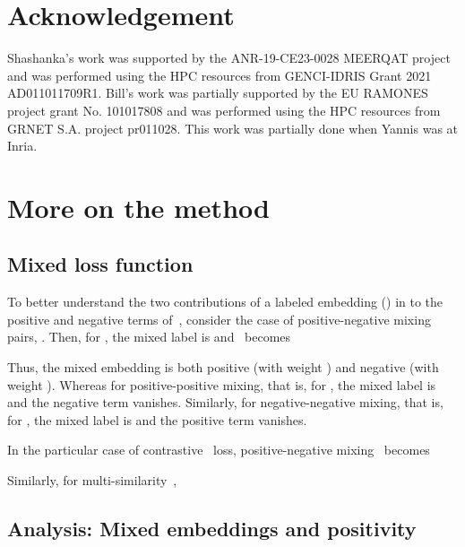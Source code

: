 \documentclass{article}
\makeatletter
\renewcommand\paragraph{\@startsection{paragraph}{4}{\z@}{1ex}{-1em}{\normalfont\normalsize\bfseries}}
\makeatother
\begin{document}
\section{Acknowledgement}
\label{sec:acknowledgement}
Shashanka's work was supported by the ANR-19-CE23-0028 MEERQAT project and was performed using the HPC resources from GENCI-IDRIS Grant 2021 AD011011709R1. Bill's work was partially supported by the EU RAMONES project grant No. 101017808 and was performed using the HPC resources from GRNET S.A. project pr011028. This work was partially done when Yannis was at Inria.

 





\clearpage


\appendix

\section{More on the method}
\label{sec:app-method}



\subsection{Mixed loss function}
\label{sec:app-idea}

\paragraph{Interpretation}

To better understand the two contributions of a labeled embedding () in  to the positive and negative terms of~, consider the case of positive-negative mixing pairs, . Then, for , the mixed label is  and~ becomes

Thus, the mixed embedding  is both positive (with weight ) and negative (with weight ). Whereas for positive-positive mixing, that is, for , the mixed label is  and the negative term vanishes. Similarly, for negative-negative mixing, that is, for , the mixed label is  and the positive term vanishes.

In the particular case of contrastive~ loss, positive-negative mixing~ becomes

Similarly, for multi-similarity~,




\subsection{Analysis: Mixed embeddings and positivity}
\label{sec:app-analysis}
\end{document}
